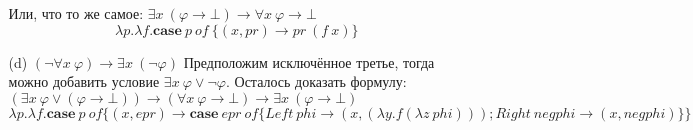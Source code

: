 \begin{enumerate}
\begin{enumerate}
Или, что то же самое:  $\exists x\ (\varphi \to \bot) \to \forall x\ \varphi \to \bot$
\begin{equation*}
	\lambda p. \lambda f. \mathbf{case} \ p \ of \ \{(x, pr) \to pr \ (f \ x)\}
\end{equation*}
\item[(d)] $(\neg \forall x\ \varphi) \to \exists x\ (\neg \varphi)$
Предположим исключённое третье, тогда можно добавить условие $\exists  x \ \varphi \lor \neg \varphi$. Осталось доказать формулу: $(\exists x\ \varphi \lor (\varphi\to \bot)) \to (\forall x\ \varphi \to \bot) \to \exists x\ ( \varphi \to \bot)$
\begin{equation*}
	\lambda p .\lambda f. \mathbf{case} \ p \ of \{ (x, epr) \to \mathbf{case} \ epr \ of \{ Left \ phi \to (x, (\lambda y. f (\lambda z\ phi))); Right \ negphi \to (x, negphi) \} \}
\end{equation*}
\end{enumerate}

\end{enumerate}

